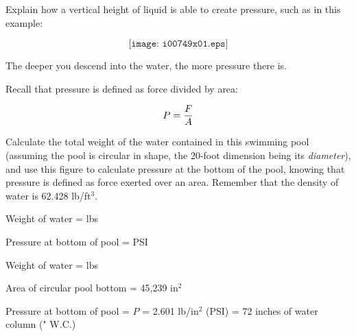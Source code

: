

Explain how a vertical height of liquid is able to create pressure, such as in this example:

$$\texttt{[image: i00749x01.eps]}$$

The deeper you descend into the water, the more pressure there is.

\vskip 10pt

Recall that pressure is defined as force divided by area:

$$P = {F \over A}$$

Calculate the total weight of the water contained in this swimming pool (assuming the pool is circular in shape, the 20-foot dimension being its {\it diameter}), and use this figure to calculate pressure at the bottom of the pool, knowing that pressure is defined as force exerted over an area.  Remember that the density of water is 62.428 lb/ft$^{3}$.

\vskip 10pt

Weight of water = \underbar{\hskip 50pt} lbs

\vskip 10pt

Pressure at bottom of pool = \underbar{\hskip 50pt} PSI

\vskip 10pt







Weight of water =  lbs

\vskip 10pt

Area of circular pool bottom = 45,239 in$^{2}$

\vskip 10pt

Pressure at bottom of pool = $P$ = 2.601 lb/in$^{2}$ (PSI) = 72 inches of water column (" W.C.)

\vskip 10pt












